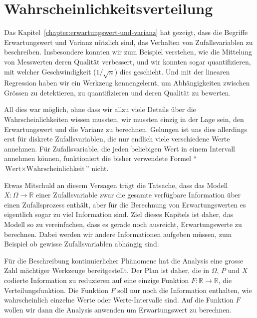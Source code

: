 %
%
%
\chapter{Wahrscheinlichkeitsverteilung} \label{chapter:wahrscheinlichkeitsverteilung}

Das Kapitel~\ref{chapter:erwartungswert-und-varianz} hat gezeigt, dass die
Begriffe Erwartungswert und Varianz nützlich sind, das Verhalten von
Zufallsvariablen zu beschreiben.
Insbesondere konnten wir zum Beispiel verstehen, wie die Mittelung von
Messwerten deren Qualität verbessert, und wir konnten sogar quantifizieren,
mit welcher Geschwindigkeit ($1/\sqrt{n}$) dies geschieht.
Und mit der linearen Regression haben wir ein Werkzeug kennengelernt, 
um Abhängigkeiten zwischen Grössen zu detektieren, zu quantifizieren
und deren Qualität zu bewerten.

All dies war möglich, ohne dass wir allzu viele Details über die
Wahrscheinlichkeiten wissen mussten, wir mussten einzig in der Lage sein,
den Erwartungswert und die Varianz zu berechnen.
Gelungen ist uns dies allerdings erst für diskrete Zufallsvariablen,
die nur endlich viele verschiedene Werte annehmen.
Für Zufallsvariable, die jeden beliebigen Wert in einem Intervall annehmen
können, funktioniert die bisher verwendete Formel
``$\text{Wert}\times\text{Wahrscheinlichkeit}$''
nicht.

Etwas Mitschuld an diesem Versagen trägt die Tatsache, dass das Modell
$X\colon\Omega\to\mathbb R$ einer Zufallsvariable zwar die gesamte verfügbare
Information über einen Zufallsprozess enthält, aber für die Berechnung 
von Erwartungswerten es eigentlich sogar zu viel Information sind.
Ziel dieses Kapitels ist daher, das Modell so zu vereinfachen, dass
es gerade noch ausreicht, Erwartungswerte zu berechnen.
Dabei werden wir andere Informationen aufgeben müssen,
zum Beispiel ob gewisse Zufallsvariablen abhängig sind.

Für die Beschreibung kontinuierlicher Phänomene hat die Analysis
eine grosse Zahl mächtiger Werkzeuge bereitgestellt.
Der Plan ist daher, die in $\Omega$, $P$ und $X$ codierte
Information zu reduzieren auf eine einzige Funktion $F\colon\mathbb R\to\mathbb R$,
die Verteilungsfunktion.
Die Funktion $F$ soll nur noch die Information enthalten, wie wahrscheinlich
einzelne Werte oder Werte-Intervalle sind.
Auf die Funktion $F$ wollen wir dann die Analysis anwenden um 
Erwartungswert zu berechnen.


